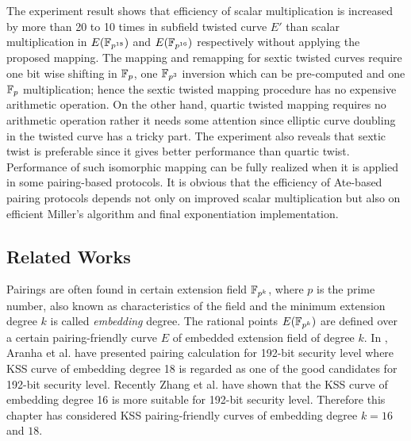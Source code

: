 The experiment result shows  that efficiency of  scalar multiplication is increased by more than 20 to 10 times in subfield  twisted curve $E'$ than scalar multiplication in $E(\mathbb{F}_{p^{18}})$ and $E(\mathbb{F}_{p^{16}})$ respectively without applying the proposed mapping. The mapping and remapping for sextic twisted curves require one bit wise shifting in ${\mathbb{F}}_{p}$, one $\mathbb{F}_{p^3}$ inversion which can be pre-computed and one ${\mathbb{F}}_{p}$ multiplication; hence the sextic twisted mapping procedure has no expensive arithmetic operation. On the other hand, quartic twisted mapping requires no arithmetic operation rather it needs some attention since elliptic curve doubling in the twisted curve has a tricky part. The experiment also reveals that sextic twist is preferable since it gives better performance than quartic twist. 
Performance of such isomorphic mapping can be fully realized when it is applied in some pairing-based protocols. 
It is obvious that the efficiency of Ate-based pairing protocols depends not only on improved scalar multiplication but also on efficient Miller's algorithm  and final exponentiation implementation. 

\subsection{Related Works}
Pairings are often found in certain extension field $\mathbb{F}_{p^k}$, where $p$ is the prime number, also known as characteristics of the field and the minimum extension degree $k$ is called \textit{embedding} degree. 
The rational points $E(\mathbb{F}_{p^k})$ are defined over a certain pairing-friendly curve $E$ of embedded extension field of degree $k$. 
In \cite{PAIRING:AFKMR12}, Aranha et al. have presented pairing calculation for 192-bit security level where  KSS curve of embedding degree 18 is regarded as one of the good candidates for 192-bit security level.
Recently Zhang et al. \cite{INDOCRYPT:ZhaLin12} have shown that the KSS curve of embedding degree 16 is more suitable for 192-bit security level.
Therefore this chapter has considered KSS pairing-friendly curves of embedding degree $k=16$ and $18$.

